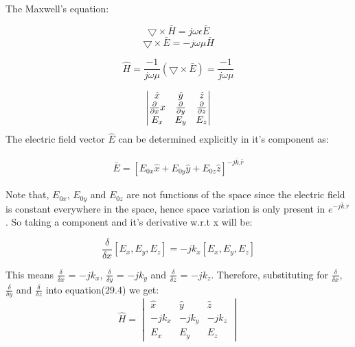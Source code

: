 The Maxwell's equation:

\begin{equation}
\bigtriangledown\times\bar{H} = j\omega\epsilon\bar{E}
\end{equation}
\begin{equation}
\bigtriangledown\times\bar{E} = -j\omega\mu\bar{H}
\end{equation}

\begin{equation}
\hat{H} = \frac{-1}{j\omega\mu}(\bigtriangledown\times\bar{E}) = 
\frac{-1}{j\omega\mu}
\end{equation}

\[ 
\begin{vmatrix}
$$\hat{x}$$ & $$\hat{y}$$ & $$\hat{z}$$\\
$$\frac{\partial}{\partial x}$$ x & $$\frac{\partial}{\partial y}$$ & $$\frac{\partial}{\partial z}$$\\
$$E_{x}$$ & $$E_{y}$$ & $$E_{z}$$
\end{vmatrix}
\]
\newline
The electric field vector $\hat{E}$ can be determined explicitly in it's component as:

\begin{align}
\bar{E} = [E_{0x}\hat{x} + E_{0y}\hat{y} + E_{0z}\hat{z}]^{-j\bar{k}.\bar{r}}
\end{align}

Note that, $E_{0x}$, $E_{0y}$ and $E_{0z}$ are not functions of the space since the electric field is constant everywhere in the space, hence space variation is only present in $e^{-j\bar{k}.\bar{r}}$.
So taking a component and it's derivative w.r.t x will be:

\begin{equation}
\frac{\delta}{\delta x} [E_x,E_y,E_z] = -jk_x[E_x,E_y,E_z]
\end{equation}

This means $\frac{\delta}{\delta x}$ = $-jk_x$, $\frac{\delta}{\delta y}$ = $-jk_y$ 
and $\frac{\delta}{\delta z}$ = $-jk_z$.
Therefore, substituting for $\frac{\delta}{\delta x}$, $\frac{\delta}{\delta y}$ and $\frac{\delta}{\delta z}$ into equation(29.4) we get:
\begin{equation}
\hat{H} = 
\begin{vmatrix}
\hat{x} & \hat{y} & \hat{z}\\
-jk_x & -jk_y & -jk_z\\
E_{x} & E_{y} & E_{z}
\end{vmatrix}
\end{equation}

